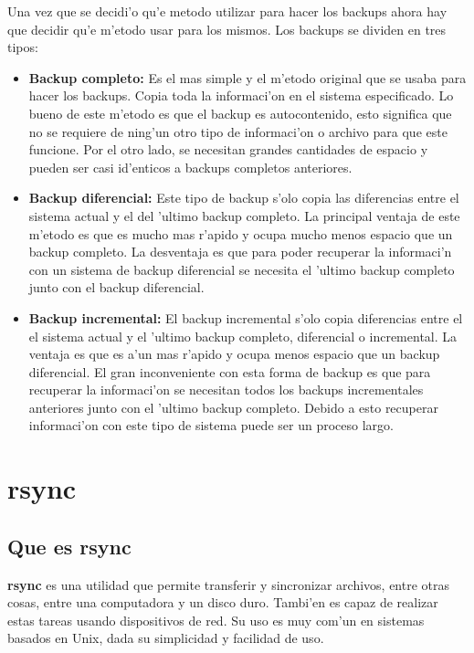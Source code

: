 \documentclass[11pt]{article}
\newcommand{\rsync}[0]{\textbf{rsync}}
\newcommand{\customitem}[1]{\item \textbf{#1:}}
\begin{document}
		Una vez que se decidi'o qu'e metodo utilizar para hacer los backups ahora hay que decidir qu'e m'etodo usar para los mismos. Los backups se dividen en tres tipos:
		\begin{itemize}
			\customitem{Backup completo} Es el mas simple y el m'etodo original que se usaba para hacer los backups. Copia toda la informaci'on en el sistema especificado. Lo bueno de este m'etodo es que el backup es autocontenido, esto significa que no se requiere de ning'un otro tipo de informaci'on o archivo para que este funcione. Por el otro lado, se necesitan grandes cantidades de espacio y pueden ser casi id'enticos a backups completos anteriores.
			\customitem{Backup diferencial} Este tipo de backup s'olo copia las diferencias entre el sistema actual y el del 'ultimo backup completo. La principal ventaja de este m'etodo es que es mucho mas r'apido y ocupa mucho menos espacio que un backup completo. La desventaja es que para poder recuperar la informaci'n con un sistema de backup diferencial se necesita el 'ultimo backup completo junto con el backup diferencial.
			\customitem{Backup incremental} El backup incremental s'olo copia diferencias entre el el sistema actual y el 'ultimo backup completo, diferencial o incremental. La ventaja es que es a'un mas r'apido y ocupa menos espacio que un backup diferencial. El gran inconveniente con esta forma de backup es que para recuperar la informaci'on se necesitan todos los backups incrementales anteriores junto con el 'ultimo backup completo. Debido a esto recuperar informaci'on con este tipo de sistema puede ser un proceso largo.
		\end{itemize}


	\section{rsync}
	\subsection{Que es rsync}
		\rsync{} es una utilidad que permite transferir y sincronizar archivos, entre otras cosas, entre una computadora y un disco duro. Tambi'en es capaz de realizar estas tareas usando dispositivos de red. Su uso es muy com'un en sistemas basados en Unix, dada su simplicidad y facilidad de uso.
\end{document}
